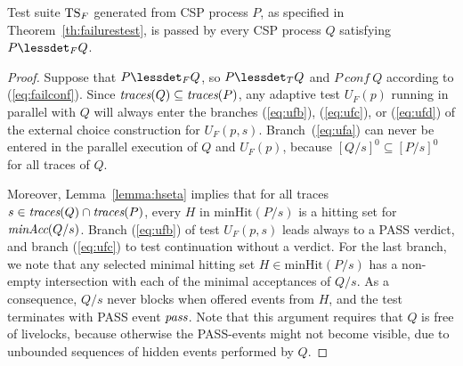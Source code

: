 \begin{lemma}\label{lemma:mainfsound}
Test suite ${\text{TS}}_F$ generated from CSP process $P$, as specified in Theorem~\ref{th:failurestest}, is passed by
every CSP process $Q$ satisfying $P\lessdet_F Q$.
\end{lemma}
\begin{proof}
Suppose that $P\lessdet_F Q$, so $P\lessdet_T Q$ and  $P\ conf\ Q$ 
according to (\ref{eq:failconf}). 
Since   $\text{\it traces}(Q)\subseteq
\text{\it traces}(P)$,   any adaptive test
$U_F(p)$ running in parallel with $Q$ will always enter the branches (\ref{eq:ufb}), (\ref{eq:ufc}), or
(\ref{eq:ufd}) of the external choice construction for $U_F(p,s)$.
Branch~(\ref{eq:ufa}) can never be entered in the parallel execution of $Q$
and $U_F(p)$, because $[Q/s]^0\subseteq [P/s]^0$ for all traces of $Q$.

Moreover,  Lemma~\ref{lemma:hseta}
implies that for all traces $s\in\text{\it traces}(Q)\cap\text{\it traces}(P)$, every $H$ in $\text{minHit}(P/s)$ is
a hitting set for $\text{\it minAcc}(Q/s)$. Branch (\ref{eq:ufb}) of test $U_F(p,s)$ 
leads always to a PASS verdict, and branch
(\ref{eq:ufc}) to test continuation without a verdict. For the last branch,
we note that any selected minimal hitting set $H\in\text{minHit}(P/s)$ has a
non-empty intersection with each of the minimal acceptances of $Q/s$. As a
consequence, $Q/s$ never blocks when offered events from $H$, and the test
terminates with PASS event ${\text{\it pass}}$. Note that this argument requires that
$Q$ is free of livelocks, because otherwise the PASS-events might not become
visible, due to unbounded sequences of hidden events performed by $Q$.
\xbox
\end{proof}

